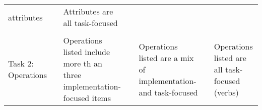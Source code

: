\documentclass[]{article}
\begin{document}
\begin{longtable}[]{@{}lllllll@{}}
\begin{minipage}[t]{0.19\columnwidth}
attributes\strut
\end{minipage} & \begin{minipage}[t]{0.03\columnwidth}\raggedright
\strut
\end{minipage} & \begin{minipage}[t]{0.20\columnwidth}\raggedright
Attributes are all task-focused\strut
\end{minipage}\tabularnewline
\begin{minipage}[t]{0.19\columnwidth}\raggedright
\strut
\end{minipage} & \begin{minipage}[t]{0.03\columnwidth}\raggedright
\strut
\end{minipage} & \begin{minipage}[t]{0.16\columnwidth}\raggedright
\strut
\end{minipage} & \begin{minipage}[t]{0.03\columnwidth}\raggedright
\strut
\end{minipage} & \begin{minipage}[t]{0.19\columnwidth}\raggedright
\strut
\end{minipage} & \begin{minipage}[t]{0.03\columnwidth}\raggedright
\strut
\end{minipage} & \begin{minipage}[t]{0.20\columnwidth}\raggedright
\strut
\end{minipage}\tabularnewline
\begin{minipage}[t]{0.19\columnwidth}\raggedright
Task 2: Operations\strut
\end{minipage} & \begin{minipage}[t]{0.03\columnwidth}\raggedright
\strut
\end{minipage} & \begin{minipage}[t]{0.16\columnwidth}\raggedright
Operations listed include more th an three implementation-focused
items\strut
\end{minipage} & \begin{minipage}[t]{0.03\columnwidth}\raggedright
\strut
\end{minipage} & \begin{minipage}[t]{0.19\columnwidth}\raggedright
Operations listed are a mix of implementation- and task-focused\strut
\end{minipage} & \begin{minipage}[t]{0.03\columnwidth}\raggedright
\strut
\end{minipage} & \begin{minipage}[t]{0.20\columnwidth}\raggedright
Operations listed are all task-focused (verbs)\strut
\end{minipage}\tabularnewline
\bottomrule
\end{longtable}
\end{document}
